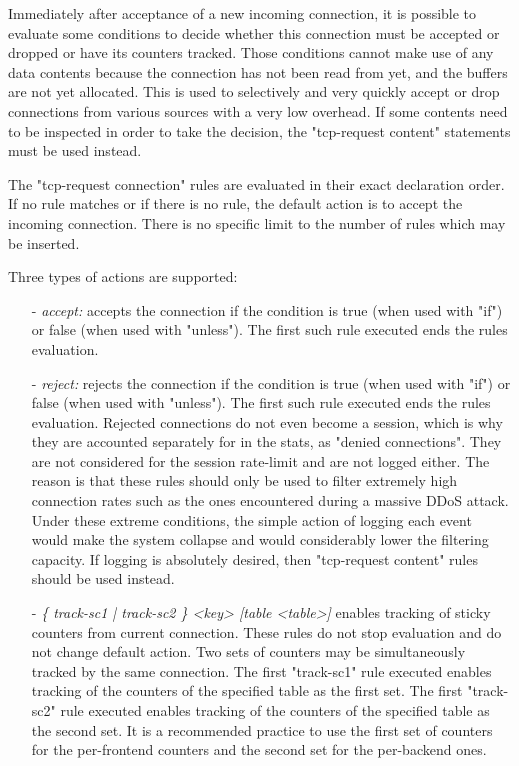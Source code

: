 {  Immediately after acceptance of a new incoming connection, it is possible to
  evaluate some conditions to decide whether this connection must be accepted
  or dropped or have its counters tracked. Those conditions cannot make use of
  any data contents because the connection has not been read from yet, and the
  buffers are not yet allocated. This is used to selectively and very quickly
  accept or drop connections from various sources with a very low overhead. If
  some contents need to be inspected in order to take the decision, the
  "tcp-request content" statements must be used instead.

  The "tcp-request connection" rules are evaluated in their exact declaration
  order. If no rule matches or if there is no rule, the default action is to
  accept the incoming connection. There is no specific limit to the number of
  rules which may be inserted.

  Three types of actions are supported:
  \begin{itemize}
  \item[-] \emph{accept:}
        accepts the connection if the condition is true (when used with "if")
        or false (when used with "unless"). The first such rule executed ends
        the rules evaluation.

  \item[-] \emph{reject:}
        rejects the connection if the condition is true (when used with "if")
        or false (when used with "unless"). The first such rule executed ends
        the rules evaluation. Rejected connections do not even become a
        session, which is why they are accounted separately for in the stats,
        as "denied connections". They are not considered for the session
        rate-limit and are not logged either. The reason is that these rules
        should only be used to filter extremely high connection rates such as
        the ones encountered during a massive DDoS attack. Under these extreme
        conditions, the simple action of logging each event would make the
        system collapse and would considerably lower the filtering capacity. If
        logging is absolutely desired, then "tcp-request content" rules should
        be used instead.

   \item[-] \emph{\{ track-sc1 | track-sc2 \} <key> [table <table>]}
        enables tracking of sticky counters from current connection. These
        rules do not stop evaluation and do not change default action. Two sets
        of counters may be simultaneously tracked by the same connection. The
        first "track-sc1" rule executed enables tracking of the counters of the
        specified table as the first set. The first "track-sc2" rule executed
        enables tracking of the counters of the specified table as the second
        set. It is a recommended practice to use the first set of counters for
        the per-frontend counters and the second set for the per-backend ones.


\end{itemize}}
